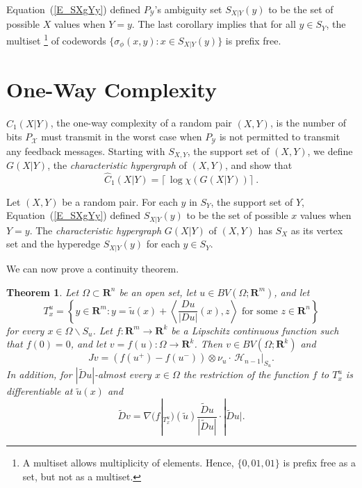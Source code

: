 \documentclass[draft]{amsart}
\newtheorem{thm}{Theorem}[section]
\theoremstyle{definition}
\theoremstyle{remark}
\newcommand{\st}{\sigma}
\newcommand{\XcY}{{(X,Y)}}
\newcommand{\SX}{{S_X}}
\newcommand{\SY}{{S_Y}}
\newcommand{\SXY}{{S_{X,Y}}}
\newcommand{\SXgYy}{{S_{X|Y}(y)}}
\newcommand{\Cw}[1]{{\hat C_#1(X|Y)}}
\newcommand{\G}{{G(X|Y)}}
\newcommand{\PY}{{P_{\mathcal{Y}}}}
\newcommand{\X}{\mathcal{X}}
\begin{document}
Equation~(\ref{E_SXgYy}) defined $\PY$'s ambiguity set $\SXgYy$
to be the set of possible $X$ values when $Y=y$.
The last corollary implies that for all $y\in\SY$,
the multiset%
\footnote{A multiset allows multiplicity of elements.
Hence, $\{0,01,01\}$ is prefix free as a set, but not as a multiset.}
of codewords $\{\st_\phi(x,y):x\in\SXgYy\}$ is prefix free.

\section{One-Way Complexity}
\label{S_Cp1}

$\Cw1$, the one-way complexity of a random pair $\XcY$,
is the number of bits $P_\X$ must transmit in the worst case
when $\PY$ is not permitted to transmit any feedback messages.
Starting with $\SXY$, the support set of $\XcY$, we define $\G$,
the \textit{characteristic hypergraph} of $\XcY$, and show that
\[
\Cw1=\lceil\,\log\chi(\G)\rceil\ .
\]

Let $\XcY$ be a random pair.
For each $y$ in $\SY$, the support set of $Y$, Equation~(\ref{E_SXgYy})
defined $\SXgYy$ to be the set of possible $x$ values when $Y=y$.
The \textit{characteristic hypergraph} $\G$ of $\XcY$
has $\SX$ as its vertex set and the hyperedge $\SXgYy$ for each $y\in\SY$.


We can now prove a continuity theorem.
\begin{thm}\label{t:conl}
Let $\Omega \subset\mathbf{R}^n$ be an open set, let
$u\in BV(\Omega ;\mathbf{R}^m)$, and let
\begin{equation}\label{quts}
T^u_x=\left\{y\in\mathbf{R}^m: y=\tilde u(x)+\left\langle \frac{Du}{|Du|}(x),z
\right\rangle \text{ for some }z\in\mathbf{R}^n\right\}
\end{equation}
for every $x\in\Omega \backslash S_u$. Let $f\colon \mathbf{R}^m\to
\mathbf{R}^k$ be a Lipschitz continuous function such that $f(0)=0$, and let $v=f(u)\colon
\Omega \to \mathbf{R}^k$. Then $v\in BV(\Omega ;\mathbf{R}^k)$ and
\begin{equation}
Jv=(f(u^+)-f(u^-))\otimes \nu_u\cdot\,
\mathcal{H}_{n-1}|_{S_u}.\end{equation}
In addition, for $|\widetilde{D}u|$-almost every $x\in\Omega $ the restriction
of the function $f$ to $T^u_x$ is differentiable at $\tilde u(x)$ and
\begin{equation}
\widetilde{D}v=\nabla (f|_{T^u_x})(\tilde u)\frac{\widetilde{D}u}{|
\widetilde{D}u|}\cdot|\widetilde{D}u|.\end{equation}
\end{thm}
\end{document}
